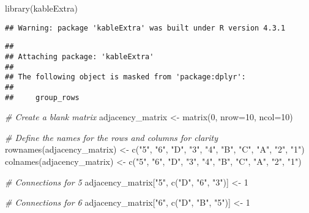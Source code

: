\documentclass[
]{article}
\newenvironment{Shaded}{\begin{snugshade}}{\end{snugshade}}
\newcommand{\AttributeTok}[1]{\textcolor[rgb]{0.77,0.63,0.00}{#1}}
\newcommand{\CommentTok}[1]{\textcolor[rgb]{0.56,0.35,0.01}{\textit{#1}}}
\newcommand{\DecValTok}[1]{\textcolor[rgb]{0.00,0.00,0.81}{#1}}
\newcommand{\FunctionTok}[1]{\textcolor[rgb]{0.00,0.00,0.00}{#1}}
\newcommand{\NormalTok}[1]{#1}
\newcommand{\OtherTok}[1]{\textcolor[rgb]{0.56,0.35,0.01}{#1}}
\newcommand{\StringTok}[1]{\textcolor[rgb]{0.31,0.60,0.02}{#1}}
\begin{document}
\begin{Shaded}
\begin{Highlighting}[]
\FunctionTok{library}\NormalTok{(kableExtra)}
\end{Highlighting}
\end{Shaded}

\begin{verbatim}
## Warning: package 'kableExtra' was built under R version 4.3.1
\end{verbatim}

\begin{verbatim}
## 
## Attaching package: 'kableExtra'
## 
## The following object is masked from 'package:dplyr':
## 
##     group_rows
\end{verbatim}

\begin{Shaded}
\begin{Highlighting}[]
\CommentTok{\# Create a blank matrix}
\NormalTok{adjacency\_matrix }\OtherTok{\textless{}{-}} \FunctionTok{matrix}\NormalTok{(}\DecValTok{0}\NormalTok{, }\AttributeTok{nrow=}\DecValTok{10}\NormalTok{, }\AttributeTok{ncol=}\DecValTok{10}\NormalTok{)}

\CommentTok{\# Define the names for the rows and columns for clarity}
\FunctionTok{rownames}\NormalTok{(adjacency\_matrix) }\OtherTok{\textless{}{-}} \FunctionTok{c}\NormalTok{(}\StringTok{"5"}\NormalTok{, }\StringTok{"6"}\NormalTok{, }\StringTok{"D"}\NormalTok{, }\StringTok{"3"}\NormalTok{, }\StringTok{"4"}\NormalTok{, }\StringTok{"B"}\NormalTok{, }\StringTok{"C"}\NormalTok{, }\StringTok{"A"}\NormalTok{, }\StringTok{"2"}\NormalTok{, }\StringTok{"1"}\NormalTok{)}
\FunctionTok{colnames}\NormalTok{(adjacency\_matrix) }\OtherTok{\textless{}{-}} \FunctionTok{c}\NormalTok{(}\StringTok{"5"}\NormalTok{, }\StringTok{"6"}\NormalTok{, }\StringTok{"D"}\NormalTok{, }\StringTok{"3"}\NormalTok{, }\StringTok{"4"}\NormalTok{, }\StringTok{"B"}\NormalTok{, }\StringTok{"C"}\NormalTok{, }\StringTok{"A"}\NormalTok{, }\StringTok{"2"}\NormalTok{, }\StringTok{"1"}\NormalTok{)}

\CommentTok{\# Connections for 5}
\NormalTok{adjacency\_matrix[}\StringTok{"5"}\NormalTok{, }\FunctionTok{c}\NormalTok{(}\StringTok{"D"}\NormalTok{, }\StringTok{"6"}\NormalTok{, }\StringTok{"3"}\NormalTok{)] }\OtherTok{\textless{}{-}} \DecValTok{1}

\CommentTok{\# Connections for 6}
\NormalTok{adjacency\_matrix[}\StringTok{"6"}\NormalTok{, }\FunctionTok{c}\NormalTok{(}\StringTok{"D"}\NormalTok{, }\StringTok{"B"}\NormalTok{, }\StringTok{"5"}\NormalTok{)] }\OtherTok{\textless{}{-}} \DecValTok{1}


\end{Highlighting}
\end{Shaded}
\end{document}
